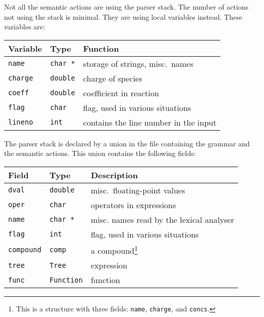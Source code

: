 Not all the semantic actions are using the parser stack. The number of
actions not using the stack is minimal. They are using 
local variables instead. These variables are:

\vspace{0.2cm}
\begin{center}
\begin{tabular}{lll}
\hline
 Variable        & Type           & Function     \\ \hline
 {\tt name}      & {\tt char *}   & storage of strings, misc.\ names \\ 
 {\tt charge}    & {\tt double}   & charge of species \\ 
 {\tt coeff}     & {\tt double}   & coefficient in reaction \\ 
 {\tt flag}      & {\tt char}     & flag, used in various situations
 \\
 {\tt lineno}    & {\tt int}      & contains the line number in the
 input \\
\hline
\end{tabular}
\end{center}
\vspace{0.2cm}

The parser stack is declared by a union in the file containing the 
grammar and the semantic actions. This union contains the following fields:

\vspace{0.2cm}
\begin{center}
\begin{tabular}{lll}
  \hline
  Field       & Type         & Description \\ \hline 
  {\tt dval}  & {\tt double} & misc.\ floating-point values \\
  {\tt oper}  & {\tt char}   & operators in expressions \\ 
  {\tt name}  & {\tt char *} & misc. names read by the lexical analyser \\ 
  {\tt flag}  & {\tt int}    & flag, used in various situations \\
  {\tt compound} & {\tt comp} & a compound\footnote{This is a
    structure with three fields: {\tt name}, {\tt charge}, and {\tt concs}.} \\
  {\tt tree}  & {\tt Tree}   & expression \\
  {\tt func}  & {\tt Function} & function \\ 
\hline
\end{tabular}
\end{center}
\vspace{0.2cm}

